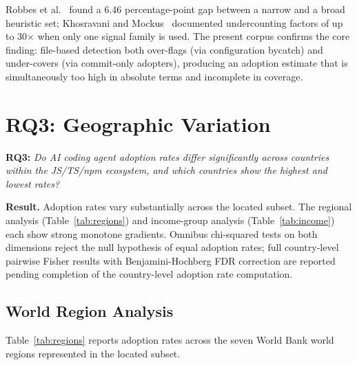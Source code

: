 Robbes et al.~\cite{robbesAgenticMuch2026} found a 6.46 percentage-point gap between a narrow and a broad heuristic set; Khosravani and Mockus~\cite{khosravani2026} documented undercounting factors of up to 30$\times$ when only one signal family is used. The present corpus confirms the core finding: file-based detection both over-flags (via configuration bycatch) and under-covers (via commit-only adopters), producing an adoption estimate that is simultaneously too high in absolute terms and incomplete in coverage.

\section{RQ3: Geographic Variation}
\label{sec:res:rq3}

\textbf{RQ3:} \textit{Do AI coding agent adoption rates differ significantly across countries within the JS/TS/npm ecosystem, and which countries show the highest and lowest rates?}

\medskip

\noindent\textbf{Result.} Adoption rates vary substantially across the located subset. The regional analysis (Table~\ref{tab:regions}) and income-group analysis (Table~\ref{tab:income}) each show strong monotone gradients. Omnibus chi-squared tests on both dimensions reject the null hypothesis of equal adoption rates; full country-level pairwise Fisher results with Benjamini-Hochberg FDR correction are reported pending completion of the country-level adoption rate computation.

\subsection{World Region Analysis}

Table~\ref{tab:regions} reports adoption rates across the seven World Bank world regions represented in the located subset.


